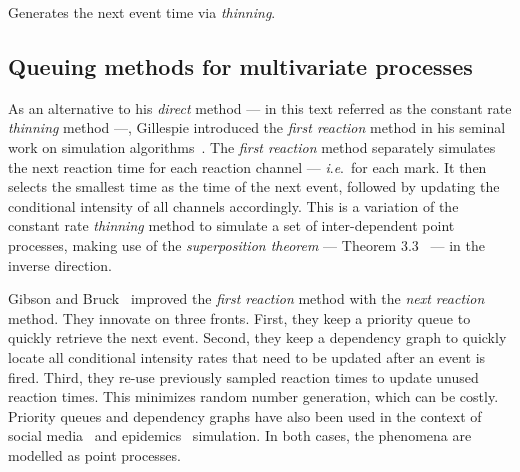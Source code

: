 \documentclass{juliacon}
\numberwithin{equation}{section}
\newcommand{\ie}{\textit{i}.\textit{e}.}
\def\ubar#1{%
\setbox0=\hbox{$#1$}
\slantmathcorr=\wd0
\underline{\hbox to 0.7\wd0{%
\vphantom{\hbox{$#1$}}}}
\hskip-0.8\wd0\hbox{$#1$}
}
\begin{document}
\begin{algorithm}[h]
\begin{algorithmic}[1]
  \Procedure{TimeViaThinning}{\([t, T) \), \( \lambda^\ast \), \( H_{t} \),}
        \State update \( \lambda^\ast \) \label{line:lambda-update}
        \State find \( \bar{B}^\ast (t) \), \( \ubar{B}^\ast (t) \) and \( L^\ast(t) \) which satisfy Eq.~\ref{eq:thinning-condition}
        \State draw candidate interval \( u \) such that \\ \hskip2.5em \( P(u > s) = \exp( - \int_0^s \bar{B}^\ast (t + s) ds ) \) \label{line:u-sample}
        \State draw acceptance threshold \( v \sim U[0, 1] \)
        \If{\( u > L^\ast(t) \)}
          \State \( t \leftarrow t + L^\ast(t) \)
          \State \textbf{next}
        \EndIf
        \If{\( ( v \leq \ubar{B}^\ast(t + u) ) \) or \( ( v \leq \lambda^\ast \, (t + u) / \bar{B}^\ast(t + u) ) \)} \label{line:short-circuit}
          \State \( t \leftarrow t + u \)
          \State \Return \( t \)
        \EndIf
        \State \( t \leftarrow t + u \)
      \EndWhile
      \State \Return \( t \)
  \EndProcedure
\end{algorithmic}
\caption{Generates the next event time via \textit{thinning}.}
\label{algo:next-time-thinning}
\end{algorithm}

\subsection{Queuing methods for multivariate processes}

As an alternative to his \textit{direct} method --- in this text referred as the constant rate \textit{thinning} method ---, Gillespie introduced the \textit{first reaction} method in his seminal work on simulation algorithms~\cite{gillespie1976}. The \textit{first reaction} method separately simulates the next reaction time for each reaction channel --- \ie~for each mark. It then selects the smallest time as the time of the next event, followed by updating the conditional intensity of all channels accordingly. This is a variation of the constant rate \textit{thinning} method to simulate a set of inter-dependent point processes, making use of the \textit{superposition theorem} --- Theorem 3.3~\cite{last2017} --- in the inverse direction.

Gibson and Bruck~\cite{gibson2000} improved the \textit{first reaction} method with the \textit{next reaction} method. They innovate on three fronts. First, they keep a priority queue to quickly retrieve the next event. Second, they keep a dependency graph to quickly locate all conditional intensity rates that need to be updated after an event is fired. Third, they re-use previously sampled reaction times to update unused reaction times. This minimizes random number generation, which can be costly. Priority queues and dependency graphs have also been used in the context of social media~\cite{farajtabar2017} and epidemics~\cite{holme2021} simulation. In both cases, the phenomena are modelled as point processes.
\end{document}

